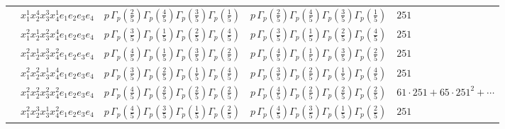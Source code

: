 \documentclass[11pt]{article}
\begin{document}
\begin{table}[ht]
{\begin{tabular}{@{}lllll@{}}
 & $x_{1}^{1} x_{2}^{4} x_{3}^{3} x_{4}^{1}  e_{1} e_{2} e_{3} e_{4}$ & $p \, \Gamma_p \left( \frac{2}{5} \right) \Gamma_p \left( \frac{4}{5} \right) \Gamma_p \left( \frac{3}{5} \right) \Gamma_p \left( \frac{1}{5} \right)$ & $p \, \Gamma_p \left( \frac{2}{5} \right) \Gamma_p \left( \frac{4}{5} \right) \Gamma_p \left( \frac{3}{5} \right) \Gamma_p \left( \frac{1}{5} \right)$ & $251$ \\
 & $x_{1}^{2} x_{2}^{1} x_{3}^{2} x_{4}^{4}  e_{1} e_{2} e_{3} e_{4}$ & $p \, \Gamma_p \left( \frac{3}{5} \right) \Gamma_p \left( \frac{1}{5} \right) \Gamma_p \left( \frac{2}{5} \right) \Gamma_p \left( \frac{4}{5} \right)$ & $p \, \Gamma_p \left( \frac{3}{5} \right) \Gamma_p \left( \frac{1}{5} \right) \Gamma_p \left( \frac{2}{5} \right) \Gamma_p \left( \frac{4}{5} \right)$ & $251$ \\
 & $x_{1}^{2} x_{2}^{1} x_{3}^{3} x_{4}^{2}  e_{1} e_{2} e_{3} e_{4}$ & $p \, \Gamma_p \left( \frac{4}{5} \right) \Gamma_p \left( \frac{1}{5} \right) \Gamma_p \left( \frac{3}{5} \right) \Gamma_p \left( \frac{2}{5} \right)$ & $p \, \Gamma_p \left( \frac{4}{5} \right) \Gamma_p \left( \frac{1}{5} \right) \Gamma_p \left( \frac{3}{5} \right) \Gamma_p \left( \frac{2}{5} \right)$ & $251$ \\
 & $x_{1}^{2} x_{2}^{2} x_{3}^{1} x_{4}^{4}  e_{1} e_{2} e_{3} e_{4}$ & $p \, \Gamma_p \left( \frac{3}{5} \right) \Gamma_p \left( \frac{2}{5} \right) \Gamma_p \left( \frac{1}{5} \right) \Gamma_p \left( \frac{4}{5} \right)$ & $p \, \Gamma_p \left( \frac{3}{5} \right) \Gamma_p \left( \frac{2}{5} \right) \Gamma_p \left( \frac{1}{5} \right) \Gamma_p \left( \frac{4}{5} \right)$ & $251$ \\
 & $x_{1}^{2} x_{2}^{2} x_{3}^{2} x_{4}^{2}  e_{1} e_{2} e_{3} e_{4}$ & $p \, \Gamma_p \left( \frac{4}{5} \right) \Gamma_p \left( \frac{2}{5} \right) \Gamma_p \left( \frac{2}{5} \right) \Gamma_p \left( \frac{2}{5} \right)$ & $p \, \Gamma_p \left( \frac{4}{5} \right) \Gamma_p \left( \frac{2}{5} \right) \Gamma_p \left( \frac{2}{5} \right) \Gamma_p \left( \frac{2}{5} \right)$ & $61{\cdot}251{+}65{\cdot}251^{2}{+}\cdots$ \\
 & $x_{1}^{2} x_{2}^{3} x_{3}^{1} x_{4}^{2}  e_{1} e_{2} e_{3} e_{4}$ & $p \, \Gamma_p \left( \frac{4}{5} \right) \Gamma_p \left( \frac{3}{5} \right) \Gamma_p \left( \frac{1}{5} \right) \Gamma_p \left( \frac{2}{5} \right)$ & $p \, \Gamma_p \left( \frac{4}{5} \right) \Gamma_p \left( \frac{3}{5} \right) \Gamma_p \left( \frac{1}{5} \right) \Gamma_p \left( \frac{2}{5} \right)$ & $251$ \\
\midrule

\end{tabular}}
\end{table}
\end{document}
